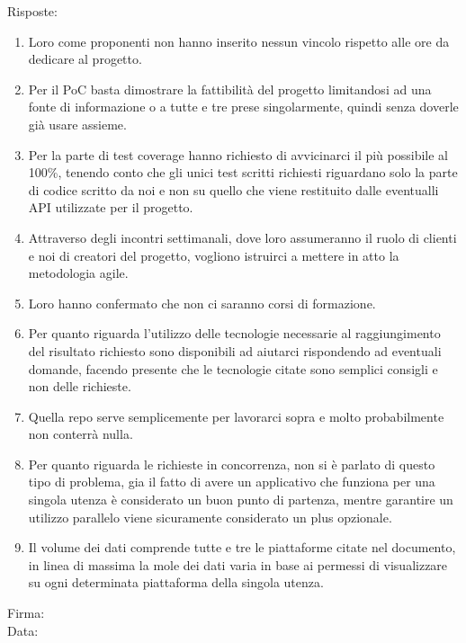 \documentclass[12pt]{article}
\begin{document}
Risposte:
\begin{enumerate}
\item Loro come proponenti non hanno inserito nessun vincolo rispetto alle ore da dedicare al progetto.
\item Per il PoC basta dimostrare la fattibilità del progetto limitandosi ad una fonte di informazione o a tutte e tre prese singolarmente, quindi senza doverle già usare assieme.
\item Per la parte di test coverage hanno richiesto di avvicinarci il 
più possibile al 100\%, tenendo conto che gli unici test scritti richiesti riguardano solo la parte di codice scritto da noi e non su quello che viene restituito dalle eventualli API utilizzate per il progetto.
\item Attraverso degli incontri settimanali, dove loro assumeranno il ruolo di clienti e noi di creatori del progetto, vogliono istruirci a mettere in atto la metodologia agile.
\item Loro hanno confermato che non ci saranno corsi di formazione.
\item Per quanto riguarda l'utilizzo delle tecnologie necessarie al raggiungimento del risultato richiesto sono disponibili ad aiutarci rispondendo ad eventuali domande, facendo presente che le tecnologie citate sono semplici consigli e non delle richieste.
\item Quella repo serve semplicemente per lavorarci sopra e molto probabilmente non conterrà nulla.
\item Per quanto riguarda le richieste in concorrenza, non si è parlato di questo tipo di problema, gia il fatto di avere un applicativo che funziona per una singola utenza è considerato un buon punto di partenza, mentre garantire un utilizzo parallelo viene sicuramente considerato un plus opzionale.
\item Il volume dei dati comprende tutte e tre le piattaforme citate nel documento, in linea di massima la mole dei dati varia in base ai permessi di visualizzare su ogni determinata piattaforma della singola utenza.
\end{enumerate}

\vfill
\begin{minipage}{10cm}
Firma: \hrulefill \\
\vspace{2mm}
Data: \dotfill
\end{minipage}
\end{document}
